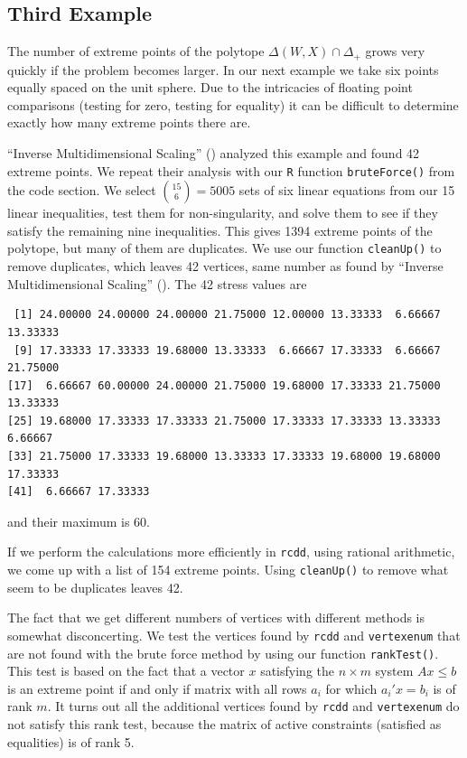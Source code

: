 \documentclass[
  12pt,
  letterpaper,
  DIV=11,
  numbers=noendperiod]{scrreprt}
\theoremstyle{remark}
\begin{document}
\subsection{Third Example}\label{third-example}

The number of extreme points of the polytope \(\Delta(W,X)\cap\Delta_+\)
grows very quickly if the problem becomes larger. In our next example we
take six points equally spaced on the unit sphere. Due to the
intricacies of floating point comparisons (testing for zero, testing for
equality) it can be difficult to determine exactly how many extreme
points there are.

{``{Inverse Multidimensional Scaling}''}
() analyzed this example and
found 42 extreme points. We repeat their analysis with our \texttt{R}
function \texttt{bruteForce()} from the code section. We select
\(\binom{15}{6}=5005\) sets of six linear equations from our 15 linear
inequalities, test them for non-singularity, and solve them to see if
they satisfy the remaining nine inequalities. This gives 1394 extreme
points of the polytope, but many of them are duplicates. We use our
function \texttt{cleanUp()} to remove duplicates, which leaves 42
vertices, same number as found by {``{Inverse Multidimensional
Scaling}''} (). The 42 stress
values are

\begin{verbatim}
 [1] 24.00000 24.00000 24.00000 21.75000 12.00000 13.33333  6.66667 13.33333
 [9] 17.33333 17.33333 19.68000 13.33333  6.66667 17.33333  6.66667 21.75000
[17]  6.66667 60.00000 24.00000 21.75000 19.68000 17.33333 21.75000 13.33333
[25] 19.68000 17.33333 17.33333 21.75000 17.33333 17.33333 13.33333  6.66667
[33] 21.75000 17.33333 19.68000 13.33333 17.33333 19.68000 19.68000 17.33333
[41]  6.66667 17.33333
\end{verbatim}

and their maximum is 60.

If we perform the calculations more efficiently in \texttt{rcdd}, using
rational arithmetic, we come up with a list of 154 extreme points. Using
\texttt{cleanUp()} to remove what seem to be duplicates leaves 42.

The fact that we get different numbers of vertices with different
methods is somewhat disconcerting. We test the vertices found by
\texttt{rcdd} and \texttt{vertexenum} that are not found with the brute
force method by using our function \texttt{rankTest()}. This test is
based on the fact that a vector \(x\) satisfying the \(n\times m\)
system \(Ax\leq b\) is an extreme point if and only if matrix with all
rows \(a_i\) for which \(a_i'x=b_i\) is of rank \(m\). It turns out all
the additional vertices found by \texttt{rcdd} and \texttt{vertexenum}
do not satisfy this rank test, because the matrix of active constraints
(satisfied as equalities) is of rank 5.
\end{document}
